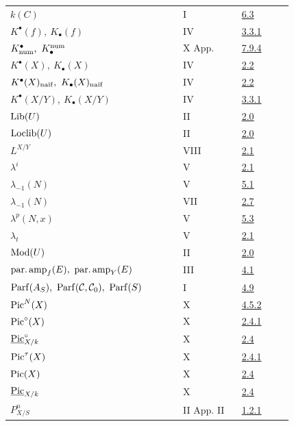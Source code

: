 \begin{longtable}{@{}>{\raggedright\arraybackslash}p{0.50\linewidth}>{\raggedright\arraybackslash}p{0.17\linewidth}>{\raggedright\arraybackslash}p{0.15\linewidth}@{}}
\(k(C)\) & I & \hyperlink{sga6.e01.para.6-3}{6.3}\\
\(K^\bullet(f),\ K_\bullet(f)\) & IV & \hyperlink{sga6.e04.para.3-3-1}{3.3.1}\\
\(K^\bullet_{\operatorname{num}},\ K^{\operatorname{num}}_\bullet\) & X App. & \hyperlink{sga6.e10.para.7-9-4}{7.9.4}\\
\(K^\bullet(X),\ K_\bullet(X)\) & IV & \hyperlink{sga6.e04.def.2-2}{2.2}\\
\(K^\bullet(X)_{\naif},\ K_\bullet(X)_{\naif}\) & IV & \hyperlink{sga6.e04.def.2-2}{2.2}\\
\(K^\bullet(X/Y),\ K_\bullet(X/Y)\) & IV & \hyperlink{sga6.e04.para.3-3-1}{3.3.1}\\
\(\operatorname{Lib}(U)\) & II & \hyperlink{sga6.e02.sec.2.0}{2.0}\\
\(\operatorname{Loclib}(U)\) & II & \hyperlink{sga6.e02.sec.2.0}{2.0}\\
\(L^{X/Y}\) & VIII & \hyperlink{sga6.e08.para.2-1}{2.1}\\
\(\lambda^i\) & V & \hyperlink{sga6.e05.def.2-1}{2.1}\\
\(\lambda_{-1}(N)\) & V & \hyperlink{sga6.e05.para.5-1}{5.1}\\
\(\lambda_{-1}(N)\) & VII & \hyperlink{sga6.e07.para.2-6}{2.7}\\
\(\lambda^p(N,x)\) & V & \hyperlink{sga6.e05.def.5-3}{5.3}\\
\(\lambda_t\) & V & \hyperlink{sga6.e05.def.2-1}{2.1}\\
\(\operatorname{Mod}(U)\) & II & \hyperlink{sga6.e02.sec.2.0}{2.0}\\
\(\parfamp_f(E),\ \parfamp_Y(E)\) & III & \hyperlink{sga6.e03.def.4-1}{4.1}\\
\(\Parf(A_S),\ \Parf(\mathcal C,\mathcal C_0),\ \Parf(S)\) & I & \hyperlink{sga6.e01.notation.4-9}{4.9}\\
\(\operatorname{Pic}^N(X)\) & X & \hyperlink{sga6.e10.prop.4-5-2}{4.5.2}\\
\(\operatorname{Pic}^\circ(X)\) & X & \hyperlink{sga6.e10.def.2-4-1}{2.4.1}\\
\(\underline{\operatorname{Pic}}^{\circ}_{X/k}\) & X & \hyperlink{sga6.e10.sec.2.4}{2.4}\\
\(\operatorname{Pic}^\tau(X)\) & X & \hyperlink{sga6.e10.def.2-4-1}{2.4.1}\\
\(\operatorname{Pic}(X)\) & X & \hyperlink{sga6.e10.sec.2.4}{2.4}\\
\(\underline{\operatorname{Pic}}_{X/k}\) & X & \hyperlink{sga6.e10.sec.2.4}{2.4}\\
\(P^n_{X/S}\) & II App. II & \hyperlink{sga6.e02.para.1-2-1}{1.2.1}\\

\end{longtable}
